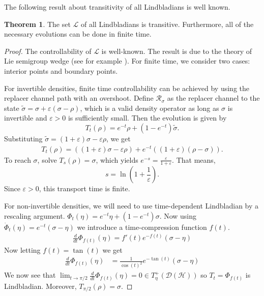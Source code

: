 \documentclass[11pt,reqno]{amsart}
\theoremstyle{definition}
\newtheorem{theorem}{Theorem}[section]
\newcommand{\mc}{\mathcal}
\begin{document}
The following result about transitivity of all Lindbladians is well known.
\begin{theorem}
    The set $\mc L$ of all Lindbladians is transitive. Furthermore, all of the necessary evolutions can be done in finite time. 
\end{theorem}
\begin{proof}
    The controllability of $\mc L$ is well-known. The result is due to the theory of Lie semigroup wedge (see for example \cite{dirr2009, hilgert1989}). For finite time, we consider two cases: interior points and boundary points.
    
    For invertible densities, finite time controllability can be achieved by using the replacer channel path with an overshoot. Define $\mc R_\sigma$ as the replacer channel to the state $\tilde{\sigma} = \sigma + \varepsilon(\sigma - \rho)$, which is a valid density operator as long as $\sigma$ is invertible and $\varepsilon > 0$ is sufficiently small. Then the evolution is given by
    $$T_t(\rho) = e^{-t} \rho + (1 - e^{-t}) \tilde{\sigma}.$$
    Substituting $\tilde{\sigma} = (1 + \varepsilon)\sigma - \varepsilon \rho$, we get
    \begin{align*}
    T_t(\rho)   = ((1 + \varepsilon)\sigma - \varepsilon \rho) + e^{-t} ((1 + \varepsilon)(\rho - \sigma)).
    \end{align*}
    To reach $\sigma$, solve $T_s(\rho) = \sigma$, which yields
    $e^{-s} = \frac{\varepsilon}{1 + \varepsilon}.$ That means, $$ s = \ln\left(1 + \frac{1}{\varepsilon}\right).$$
    Since $\varepsilon > 0$, this transport time is finite.

    For non-invertible densities, we will need to use time-dependent Lindbladian by a rescaling argument. $\Phi_t(\eta) = e^{-t} \eta + (1-e^{-t}) \sigma$. Now using $\dot \Phi_t(\eta) = e^{-t}(\sigma-\eta)$ we introduce a time-compression function $f(t)$. 
    \begin{align*}
    \frac{d}{dt} \Phi_{f(t)}(\eta) = f'(t) e^{-f(t)}(\sigma - \eta)
    \end{align*}
    Now letting $f(t) = \tan(t)$ we get 
    \begin{align*}
    \frac{d}{dt} \Phi_{f(t)}(\eta) &= \frac{1}{\cos(t)^2} e^{-\tan(t)}(\sigma - \eta)
    \end{align*}
    We now see that $\lim_{t \to \pi/2} \frac{d}{dt} \Phi_{f(t)}(\eta) = 0 \in T^+_\eta(\mc D(\mc{H}))$ so $T_t = \Phi_{f(t)}$ is Lindbladian. Moreover, $T_{\pi/2}(\rho) = \sigma$.
\end{proof}
\end{document}
